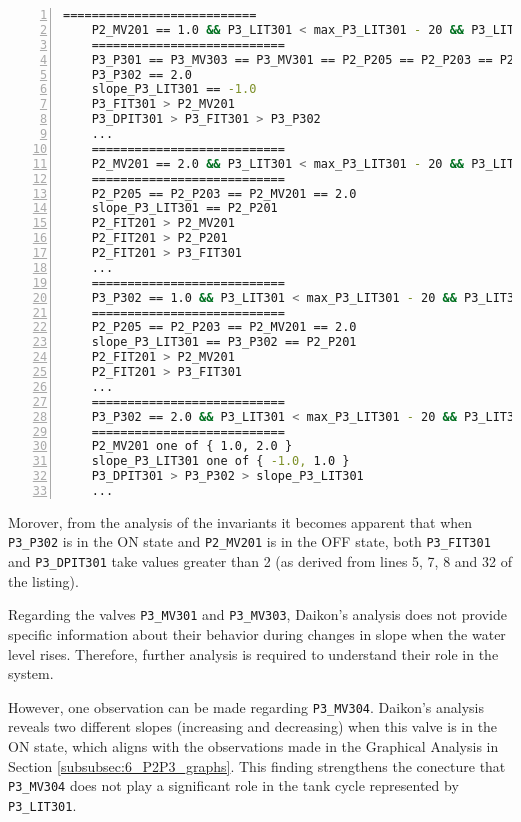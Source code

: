 \begin{lstlisting}[language=bash, numbers=left, caption=Conditional Invariants for \texttt{P2\_MV201} and \texttt{P3\_P302}, label=lst:6_preproc_P2P3_conditional_invariants]
	===========================
	P2_MV201 == 1.0 && P3_LIT301 < max_P3_LIT301 - 20 && P3_LIT301 > min_P3_LIT301 + 24 
	===========================
	P3_P301 == P3_MV303 == P3_MV301 == P2_P205 == P2_P203 == P2_MV201 == 1.0
	P3_P302 == 2.0
	slope_P3_LIT301 == -1.0
	P3_FIT301 > P2_MV201
	P3_DPIT301 > P3_FIT301 > P3_P302
	...
	===========================
	P2_MV201 == 2.0 && P3_LIT301 < max_P3_LIT301 - 20 && P3_LIT301 > min_P3_LIT301 + 24 
	===========================
	P2_P205 == P2_P203 == P2_MV201 == 2.0
	slope_P3_LIT301 == P2_P201
	P2_FIT201 > P2_MV201
	P2_FIT201 > P2_P201
	P2_FIT201 > P3_FIT301
	...
	===========================
	P3_P302 == 1.0 && P3_LIT301 < max_P3_LIT301 - 20 && P3_LIT301 > min_P3_LIT301 + 24 
	===========================
	P2_P205 == P2_P203 == P2_MV201 == 2.0
	slope_P3_LIT301 == P3_P302 == P2_P201
	P2_FIT201 > P2_MV201
	P2_FIT201 > P3_FIT301
	...
	===========================
	P3_P302 == 2.0 && P3_LIT301 < max_P3_LIT301 - 20 && P3_LIT301 > min_P3_LIT301 + 24 
	===========================
	P2_MV201 one of { 1.0, 2.0 }
	slope_P3_LIT301 one of { -1.0, 1.0 }
	P3_DPIT301 > P3_P302 > slope_P3_LIT301
	...
\end{lstlisting}

Morover, from the analysis of the invariants it becomes apparent that when \texttt{P3\_P302} is in the ON state and \texttt{P2\_MV201} is in the OFF state, both \texttt{P3\_FIT301} and \texttt{P3\_DPIT301} take values greater than 2 (as derived from lines 5, 7, 8 and 32 of the listing). 

\bigskip
Regarding the valves \texttt{P3\_MV301} and \texttt{P3\_MV303}, Daikon's analysis does not provide specific information about their behavior during changes in slope when the water level rises. Therefore, further analysis is required to understand their role in the system.

However, one observation can be made regarding \texttt{P3\_MV304}. Daikon's analysis reveals two different slopes (increasing and decreasing) when this valve is in the ON state, which aligns with the observations made in the Graphical Analysis in Section \ref{subsubsec:6_P2P3_graphs}. This finding strengthens the conecture that \texttt{P3\_MV304} does not play a significant role in the tank cycle represented by \texttt{P3\_LIT301}.

